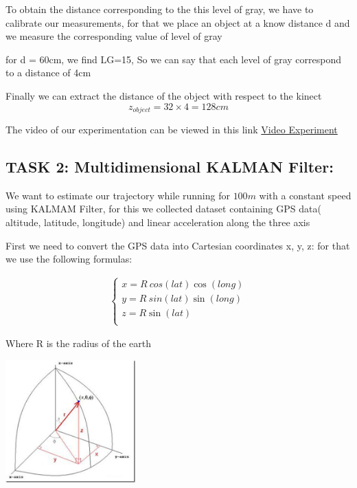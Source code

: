 \documentclass[12pt,a4paper]{report}
\begin{document}
To obtain the distance corresponding to the this level of gray, we have to calibrate our measurements, for that we place an object at a know distance d and we measure the corresponding value of level of gray 

for d = 60cm, we find LG=15, So we can say that each level of gray correspond to a distance of 4cm

Finally we can extract the distance of the object with respect to the kinect 
$$z_{object}=32\times 4 = 128 cm$$

The video of our experimentation can be viewed in this link \href{https://drive.google.com/file/d/1OEsvAl61pb7uJY_YpaSLdzBjhnByoN81/view}{Video Experiment}  


\subsection{TASK 2: Multidimensional KALMAN Filter:}
We want to estimate our trajectory while running for $100m$ with a constant speed using KALMAM Filter, for this we collected dataset containing GPS data( altitude, latitude, longitude) and linear acceleration along the three axis  

First we need to convert the GPS data into Cartesian coordinates x, y, z:
for that we use the following formulas:

\begin{eqnarray}
\left\{\begin{array}{c} 
 x =   R \ cos (lat)  \cos (long) \\ 
 y = R \ sin (lat)  \sin (long)\\  
 z = R \sin (lat)  \\ 
 \end{array} \right.
\end{eqnarray}

Where R is the radius of the earth

\begin{center}
\includegraphics[width=5cm]{Capture1.jpg}
\end{center}
\end{document}
